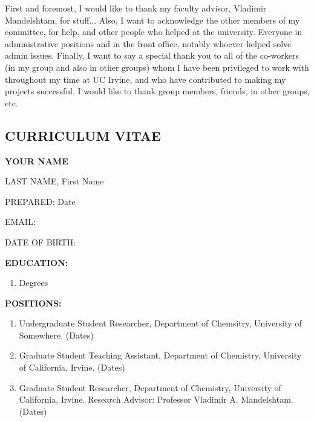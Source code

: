 \documentclass[12pt]{article}
\begin{document}
First and foremost, I would like to thank my faculty advisor, Vladimir Mandelshtam, for stuff...
Also, I want to acknowledge the other members of my committee, for help, and other people who helped at the university.
Everyone in administrative positions and in the front office, notably whoever helped solve admin issues. 
Finally, I want to say a special thank you to all of the co-workers (in my group and also in other groups) whom I have been privileged to work with throughout my time at UC Irvine, and who have contributed to making my projects successful. 
I would like to thank group members, friends, in other groups, etc. 
\newpage
\begin{center}
\section*{\uppercase{Curriculum Vitae}}

\Large{\uppercase{{\bf Your Name}}}
\end{center}

\uppercase{Last Name}, First Name

\uppercase{Prepared}: Date

\uppercase{Email}: 

\uppercase{Date of Birth}: 

\uppercase{{\bf Education:}}
\begin{enumerate}
\singlespacing
\item Degrees
\end{enumerate}

\uppercase{{\bf Positions:}}
\begin{enumerate}
\singlespacing
\item Undergraduate Student Researcher, Department of Chemsitry, University of Somewhere. (Dates)
\item Graduate Student Teaching Assistant, Department of Chemistry, University of California, Irvine. (Dates)
\item Graduate Student Researcher, Department of Chemistry, University of California, Irvine. Research Advisor: 
Professor Vladimir A. Mandelshtam. (Dates)
\end{enumerate}
\end{document}

